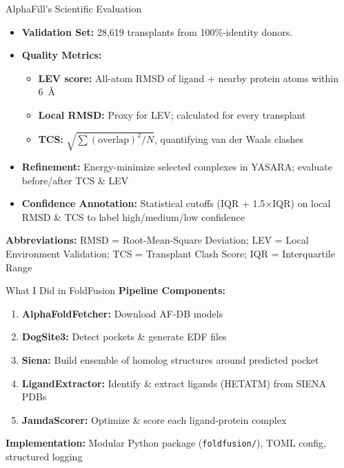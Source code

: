 \documentclass[aspectratio=169]{beamer}
\begin{document}
\begin{frame}{AlphaFill's Scientific Evaluation}
    \begin{itemize}
        \item \textbf{Validation Set:} 28,619 transplants from 100\%-identity donors.
        \item \textbf{Quality Metrics:}
              \begin{itemize}
                  \item \textbf{LEV score:} All-atom RMSD of ligand + nearby protein atoms within 6~\AA
                  \item \textbf{Local RMSD:} Proxy for LEV; calculated for every transplant
                  \item \textbf{TCS:} $\sqrt{\sum (\text{overlap})^2 / N}$, quantifying van der Waals clashes
              \end{itemize}
        \item \textbf{Refinement:} Energy-minimize selected complexes in YASARA; evaluate before/after TCS \& LEV
        \item \textbf{Confidence Annotation:} Statistical cutoffs (IQR + 1.5$\times$IQR) on local RMSD \& TCS to label high/medium/low confidence
    \end{itemize}
    \footnotesize{
        \vspace{0.5em}
        \textbf{Abbreviations:} RMSD = Root-Mean-Square Deviation; LEV = Local Environment Validation; TCS = Transplant Clash Score; IQR = Interquartile Range
    }
\end{frame}

\begin{frame}{What I Did in FoldFusion}
    \textbf{Pipeline Components:}
    \begin{enumerate}
        \item \textbf{AlphaFoldFetcher:} Download AF-DB models
        \item \textbf{DogSite3:} Detect pockets \& generate EDF files
        \item \textbf{Siena:} Build ensemble of homolog structures around predicted pocket
        \item \textbf{LigandExtractor:} Identify \& extract ligands (HETATM) from SIENA PDBs
        \item \textbf{JamdaScorer:} Optimize \& score each ligand-protein complex
    \end{enumerate}
    \textbf{Implementation:} Modular Python package (\texttt{foldfusion/}), TOML config, structured logging
\end{frame}
\end{document}
